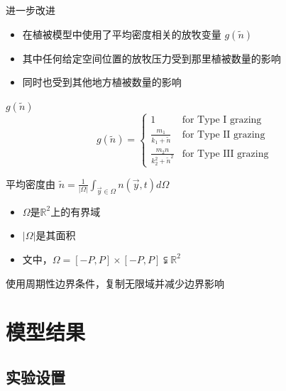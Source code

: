 \documentclass[aspectratio=169, 12pt, utf8, mathserif]{ctexbeamer} %
\begin{document}
\begin{frame}
	\begin{exampleblock}{进一步改进}
		\begin{itemize}
			\tiny \item 在植被模型中使用了平均密度相关的放牧变量 $g(\tilde{n})$
			\tiny \item 其中任何给定空间位置的放牧压力受到那里植被数量的影响
			\tiny \item 同时也受到其他地方植被数量的影响
		\end{itemize}
	\end{exampleblock}
	
	\begin{exampleblock}{$g(\tilde{n})$}
		\[
		g(\tilde{n}) = 
		\begin{cases}
			1 & \text{for Type I grazing}\\
			\frac{m_1}{k_1 + \tilde{n}} & \text{for Type II grazing}\\
			\frac{m_2n}{k_2^2 + \tilde{n}^2} & \text{for Type III grazing}
		\end{cases}
		\]
	\end{exampleblock}
	
	\begin{enumerate}
{\tiny 		\item 平均密度由
		\(\tilde{n} = \frac{1}{|\Omega|}\int_{\vec{y}\in\Omega}n(\vec{y},t)d\Omega \)
		\begin{itemize}
			\tiny \item $\Omega$是$\mathbb{R}^{2}$上的有界域
			\tiny \item $|\Omega|$是其面积
			\tiny \item 文中，$\Omega=[-P,P]\times[-P,P]\subsetneqq\mathbb{R}^2$
		\end{itemize}
		\item 使用周期性边界条件，复制无限域并减少边界影响
		}
	\end{enumerate}
\end{frame}

\section{模型结果}
\subsection{实验设置}
\end{document}
